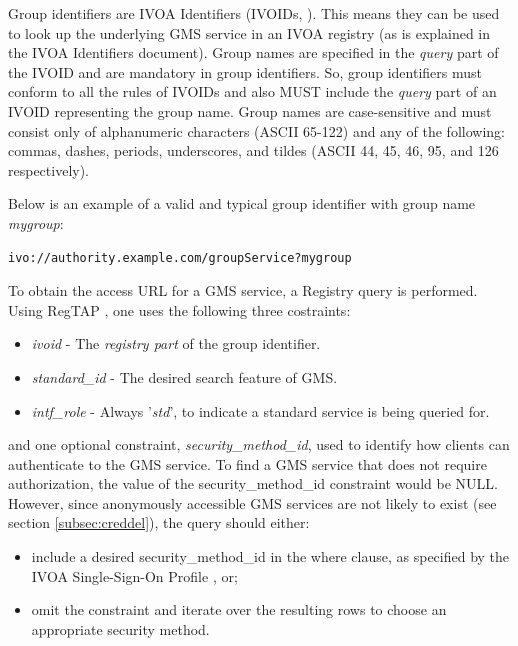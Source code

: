 \documentclass[11pt,a4paper]{ivoa}
\begin{document}
Group identifiers are IVOA Identifiers (IVOIDs, \citet{2016ivoa.spec.0523D}).  This means they can be used to look up the underlying GMS service in an IVOA registry (as is explained in the IVOA Identifiers document).  Group names are specified in the \emph{query} part of the IVOID and are mandatory in group identifiers.  So, group identifiers must conform to all the rules of IVOIDs and also MUST include the \emph{query} part of an IVOID representing the group name.  Group names are case-sensitive and must consist only of alphanumeric characters (ASCII 65-122) and any of the following: commas, dashes, periods, underscores, and tildes (ASCII 44, 45, 46, 95, and 126 respectively).

Below is an example of a valid and typical group identifier with group name \emph{mygroup}:

\begin{verbatim}
ivo://authority.example.com/groupService?mygroup
\end{verbatim}

To obtain the access URL for a GMS service, a Registry query is performed. Using RegTAP \citep{2014ivoa.spec.1208D}, one uses the following three costraints:

\begin{itemize}
\item{\emph{ivoid}} - The \emph{registry part} of the group identifier.
\item{\emph{standard\_id}} - The desired search feature of GMS.
\item{\emph{intf\_role}} - Always '\emph{std}', to indicate a standard service is being queried for.
\end{itemize}

and one optional constraint, \emph{security\_method\_id}, used to identify how clients can authenticate to the GMS service.  To find a GMS service that does not require authorization, the value of the security\_method\_id constraint would be NULL.  However, since anonymously accessible GMS services are not likely to exist (see section \ref{subsec:creddel}), the query should either:

\begin{itemize}
\item include a desired security\_method\_id in the where clause, as specified by the IVOA Single-Sign-On Profile \citep{2017ivoa.spec.0524T}, or;
\item omit the constraint and iterate over the resulting rows to choose an appropriate security method.
\end{itemize}
\end{document}
